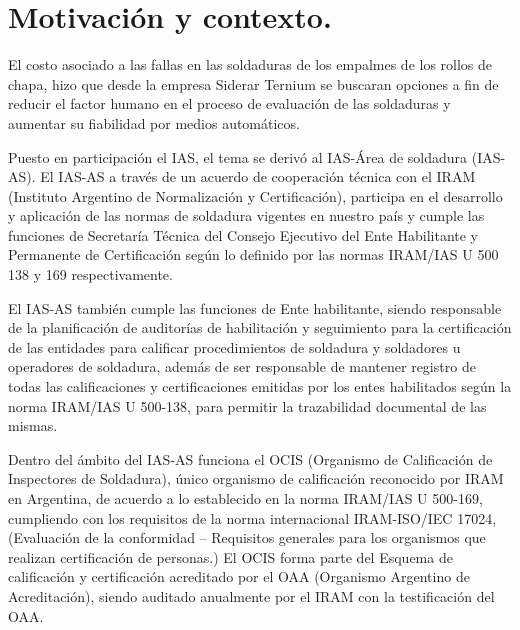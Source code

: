 
\section{Motivación y contexto.}

El costo asociado a las fallas en las soldaduras de los empalmes de los rollos de chapa, hizo que desde la empresa Siderar Ternium se buscaran opciones a fin de reducir el factor humano en el proceso de evaluación de las soldaduras y aumentar su fiabilidad por medios automáticos. 

Puesto en participación el IAS, el tema se derivó al IAS-Área de soldadura (IAS-AS). El IAS-AS a través de un acuerdo de cooperación técnica con el IRAM (Instituto Argentino de Normalización y Certificación), participa en el desarrollo y aplicación de las normas de soldadura vigentes en nuestro país y cumple las funciones de Secretaría Técnica del Consejo Ejecutivo del Ente Habilitante y Permanente de Certificación según lo definido por las normas IRAM/IAS U 500 138 y 169 respectivamente.

El IAS-AS también cumple las funciones de Ente habilitante, siendo responsable de la planificación de auditorías de habilitación y seguimiento para la certificación de las entidades para calificar procedimientos de soldadura y soldadores u operadores de soldadura, además de ser responsable de mantener registro de todas las calificaciones y certificaciones emitidas por los entes habilitados según la norma IRAM/IAS U 500-138, para permitir la trazabilidad documental de las mismas.

Dentro del ámbito del IAS-AS funciona el OCIS (Organismo de Calificación de Inspectores de Soldadura), único organismo de calificación reconocido por IRAM en Argentina, de acuerdo a lo establecido en la norma IRAM/IAS U 500-169, cumpliendo con los requisitos de la norma internacional IRAM-ISO/IEC 17024, (Evaluación de la conformidad – Requisitos generales para los organismos que realizan certificación de personas.) El OCIS forma parte del Esquema de calificación y certificación acreditado por el OAA (Organismo Argentino de Acreditación), siendo auditado anualmente por el IRAM con la testificación del OAA.




